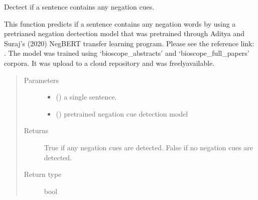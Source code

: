 \documentclass[letterpaper,10pt,english]{sphinxmanual}
\begin{document}
\begin{fulllineitems}
\label{\detokenize{negation_cue_scope:negation_cue_scope.negation_detect}}
\sphinxAtStartPar
Dectect if a sentence contains any negation cues.

\sphinxAtStartPar
This function predicts if a sentence contains any negation words by using a pre\sphinxhyphen{}trianed negation dectection model that was pre\sphinxhyphen{}trained through Aditya and Suraj’s (2020) NegBERT transfer learning program.
Please see the reference link: . The model was trained using ‘bioscope\_abstracts’ and ‘bioscope\_full\_papers’ corpora.
It was upload to a cloud repository and was freely\sphinxhyphen{}available.
\begin{quote}\begin{description}
\item[{Parameters}] \leavevmode\begin{itemize}
\item {} 
\sphinxAtStartPar
{} () \textendash{} a single sentence.

\item {} 
\sphinxAtStartPar
{} () \textendash{} pre\sphinxhyphen{}trained negation cue detection model

\end{itemize}

\item[{Returns}] \leavevmode
\sphinxAtStartPar
True if any negation cues are detected.
False if no negation cues are detected.

\item[{Return type}] \leavevmode
\sphinxAtStartPar
bool

\end{description}\end{quote}


\nopagebreak


\sphinxAtStartPar
{\hyperref[\detokenize{negation_cue_scope:negation_cue_scope.negation_scope}]{}}



\end{fulllineitems}
\end{document}
